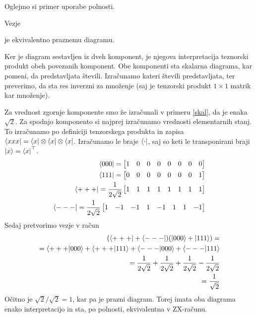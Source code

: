 \documentclass[mat1]{fmfdelo}
\newcommand{\tranp}{\top}
\begin{document}
Oglejmo si primer uporabe polnosti.
\begin{primer}\label{inv-koren}
    Vezje
    \begin{center}
    \end{center}
    je ekvivalentno praznemu diagramu.
    
    Ker je diagram sestavljen iz dveh komponent, je njegova interpretacija teznorski produkt obeh povezanih komponent. Obe komponenti sta skalarna diagrama, kar pomeni, da predstavljata števili. Izračunamo kateri števili predstavljata, ter preverimo, da sta res inverzni za množenje (saj je tenzorski produkt \(1\times 1\) matrik kar množenje).

    Za vrednost zgornje komponente smo že izračunali v primeru \ref{skal}, da je enaka \(\sqrt{2}\).
    Za spodnjo komponento si najprej izračunamo vrednosti elementarnih stanj. To izračunamo po definiciji tenzorskega produkta in zapisa \(\bra{xxx} = \bra{x}\otimes \bra{x}\otimes \bra{x}\). Izračunamo le braje \(\bra{\cdot}\), saj so keti le transponirani braji \(\ket{x}=\bra{x}^\tranp\).
    \begin{align*}
        \bra{000} = \begin{bmatrix}
            1&0&0&0& 0&0&0&0
        \end{bmatrix}\\
        \bra{111} = \begin{bmatrix}
            0&0&0&0& 0&0&0&1
        \end{bmatrix}\\
        \bra{+++} = \frac{1}{2\sqrt{2}}\begin{bmatrix}
            1&1&1&1& 1&1&1&1
        \end{bmatrix}\\
        \bra{---} = \frac{1}{2\sqrt{2}} \begin{bmatrix}
            1&-1&-1&1& -1&1&1&-1
        \end{bmatrix}
    \end{align*}
    Sedaj pretvorimo vezje v račun
    \begin{align*}
        (\bra{+++}+\bra{---})(\ket{000}+\ket{111})=\\
        =\braket{+++}{000}+\braket{+++}{111}+\braket{---}{000}+\braket{---}{111}\\
        =\frac{1}{2\sqrt2}+\frac{1}{2\sqrt2}+\frac{1}{2\sqrt2}-\frac{1}{2\sqrt2}\\
        =\frac{1}{\sqrt2}
    \end{align*}
    Očitno je \(\sqrt2/\sqrt2 = 1\), kar pa je prazni diagram. Torej imata oba diagrama enako interpretacijo in sta, po polnosti, ekvivalentna v ZX-računu.
\end{primer}
\end{document}

